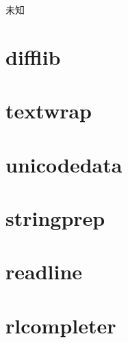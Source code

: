 \noindent{\color{red}{match.string:}}
\par{未知}\\


\section{difflib}





\section{textwrap}





\section{unicodedata}





\section{stringprep}





\section{readline}





\section{rlcompleter}






